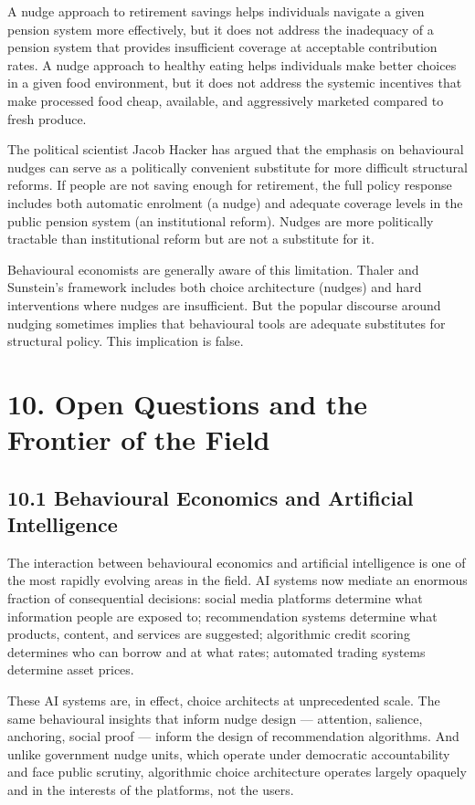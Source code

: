 \documentclass[12pt, letterpaper]{article}
\begin{document}
A nudge approach to retirement savings helps individuals navigate a given pension system more effectively, but it does not address the inadequacy of a pension system that provides insufficient coverage at acceptable contribution rates. A nudge approach to healthy eating helps individuals make better choices in a given food environment, but it does not address the systemic incentives that make processed food cheap, available, and aggressively marketed compared to fresh produce.

The political scientist Jacob Hacker has argued that the emphasis on behavioural nudges can serve as a politically convenient substitute for more difficult structural reforms. If people are not saving enough for retirement, the full policy response includes both automatic enrolment (a nudge) and adequate coverage levels in the public pension system (an institutional reform). Nudges are more politically tractable than institutional reform but are not a substitute for it.

Behavioural economists are generally aware of this limitation. Thaler and Sunstein's framework includes both choice architecture (nudges) and hard interventions where nudges are insufficient. But the popular discourse around nudging sometimes implies that behavioural tools are adequate substitutes for structural policy. This implication is false.

\medskip


\section{10. Open Questions and the Frontier of the Field}



\subsection{10.1 Behavioural Economics and Artificial Intelligence}


The interaction between behavioural economics and artificial intelligence is one of the most rapidly evolving areas in the field. AI systems now mediate an enormous fraction of consequential decisions: social media platforms determine what information people are exposed to; recommendation systems determine what products, content, and services are suggested; algorithmic credit scoring determines who can borrow and at what rates; automated trading systems determine asset prices.

These AI systems are, in effect, choice architects at unprecedented scale. The same behavioural insights that inform nudge design --- attention, salience, anchoring, social proof --- inform the design of recommendation algorithms. And unlike government nudge units, which operate under democratic accountability and face public scrutiny, algorithmic choice architecture operates largely opaquely and in the interests of the platforms, not the users.
\end{document}
